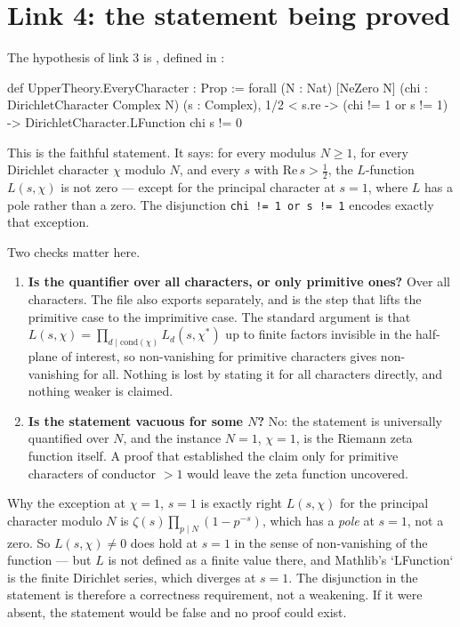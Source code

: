 \section{Link 4: the statement being proved}The hypothesis of link 3 is , defined in
:

\begin{seamnote}{}
\begin{leanquote}
def UpperTheory.EveryCharacter : Prop :=
  forall (N : Nat) [NeZero N] (chi : DirichletCharacter Complex N) (s : Complex),
    1/2 < s.re -> (chi != 1 or s != 1) -> DirichletCharacter.LFunction chi s != 0
\end{leanquote}
\end{seamnote}

This is the faithful statement. It says: for every modulus $N \ge 1$, for every
Dirichlet character $\chi$ modulo $N$, and every $s$ with $\mathrm{Re}\,  s >
\tfrac12$, the $L$-function $L(s,\chi)$ is not zero --- except for the
principal character at $s = 1$, where $L$ has a pole rather than a zero. The
disjunction \texttt{chi != 1 or s != 1} encodes exactly that exception.

Two checks matter here.

\begin{enumerate}
\item \textbf{Is the quantifier over all characters, or only primitive ones?}
Over all characters. The file also exports
 separately, and
 is the step that lifts the primitive
case to the imprimitive case. The standard argument is that $L(s,\chi) =
\prod_{d \mid \mathrm{cond}(\chi)} L_d(s,\chi^*)$ up to finite factors
invisible in the half-plane of interest, so non-vanishing for primitive
characters gives non-vanishing for all. Nothing is lost by stating it for all
characters directly, and nothing weaker is claimed.
\item \textbf{Is the statement vacuous for some $N$?} No: the statement is
universally quantified over $N$, and the instance $N = 1$, $\chi = 1$, is the
Riemann zeta function itself. A proof that established the claim only for
primitive characters of conductor $> 1$ would leave the zeta function
uncovered.
\end{enumerate}

\begin{deeper}{Why the exception at $\chi = 1$, $s = 1$ is exactly right}
$L(s, \chi)$ for the principal character modulo $N$ is
$\zeta(s)\prod_{p \mid N}(1 - p^{-s})$, which has a \emph{pole} at $s = 1$,
not a zero. So $L(s,\chi) \neq 0$ does hold at $s=1$ in the sense of
non-vanishing of the function --- but $L$ is not defined as a finite value
there, and Mathlib's `LFunction` is the finite Dirichlet series, which
diverges at $s = 1$. The disjunction in the statement is therefore a
correctness requirement, not a weakening. If it were absent, the statement
would be false and no proof could exist.
\end{deeper}

